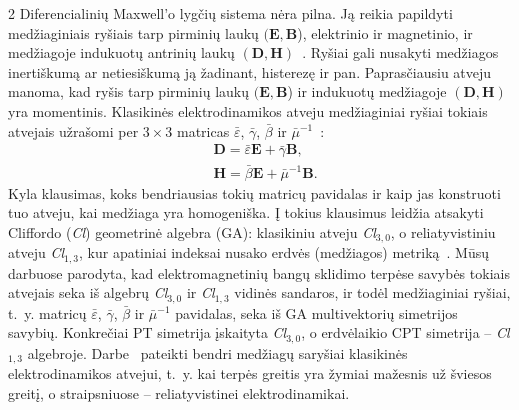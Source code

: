 \documentclass[a4paper,10pt,lithuanian]{article}
\def\bE{\mathbf{E}}
\def\bH{\mathbf{H}}
\def\bD{\mathbf{D}}
\def\bB{\mathbf{B}}
\begin{document}
\begin{multicols*}{2}
Diferencialinių Maxwell'o  lygčių sistema nėra pilna.  Ją reikia
papildyti medžiaginiais ryšiais tarp pirminių laukų $(\bE,\bB$),
elektrinio ir magnetinio, ir medžiagoje indukuotų antrinių laukų
$(\bD,\bH)$~\cite{key-1}. Ryšiai gali nusakyti medžiagos inertiškumą ar
netiesiškumą ją žadinant, histerezę ir pan. Paprasčiausiu atveju
manoma, kad  ryšis tarp pirminių laukų $(\bE,\bB$) ir  indukuotų medžiagoje $(\bD,\bH)$ yra
momentinis. Klasikinės elektrodinamikos atveju medžiaginiai ryšiai
tokiais atvejais užrašomi per $3\times 3$ matricas
$\bar{\varepsilon}$, $\bar{\gamma}$, $\bar{\beta}$ ir
$\bar{\mu}^{-1}$~\cite{key-1}:
\begin{equation}\begin{split}
&\bD=\bar{\varepsilon}\bE+\bar{\gamma}\bB,\\
&\bH=\bar{\beta}\bE+\bar{\mu}^{-1}\bB.
 \end{split}\end{equation}
Kyla klausimas, koks  bendriausias tokių matricų pavidalas ir kaip jas konstruoti  tuo atveju,
kai medžiaga yra homogeniška. Į tokius klausimus leidžia atsakyti
Cliffordo (\textit{Cl}) geometrinė algebra (GA): klasikiniu atveju
\textit{Cl}$_{3,0}$, o reliatyvistiniu atveju \textit{Cl}$_{1,3}$,
kur apatiniai indeksai nusako erdvės (medžiagos) metriką~\cite{key-2}. Mūsų
darbuose \cite{key-2,key-3} parodyta, kad elektromagnetinių bangų sklidimo
terpėse  savybės tokiais atvejais seka iš algebrų
\textit{Cl}$_{3,0}$ ir \textit{Cl}$_{1,3}$  vidinės sandaros, ir
todėl medžiaginiai ryšiai, t.~y. matricų $\bar{\varepsilon}$,
$\bar{\gamma}$, $\bar{\beta}$ ir $\bar{\mu}^{-1}$ pavidalas, seka
iš GA multivektorių simetrijos savybių.  Konkrečiai PT simetrija įskaityta \textit{Cl}$_{3,0}$,
o erdvėlaikio CPT simetrija  --  \textit{Cl}$_{1,3}$  algebroje.   Darbe~\cite{key-3} pateikti bendri
medžiagų saryšiai klasikinės elektrodinamikos atvejui, t.~y. kai
terpės greitis yra žymiai mažesnis už šviesos greitį, o
straipsniuose \cite{key-4,key-5} -- reliatyvistinei elektrodinamikai.


\end{multicols*}
\end{document}
